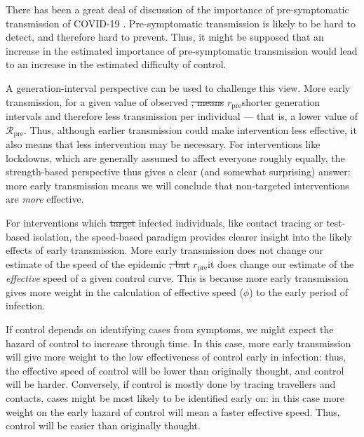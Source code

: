 \documentclass[12pt]{article}
\newcommand{\RR}{\ensuremath{{\mathcal R}}}
\newcommand{\Rx}[1]{\ensuremath{\RR_{\mathrm{#1}}}} %
\newcommand{\Rpre}{\Rx{pre}} %
\newcommand{\rr}{\ensuremath{{r}}}
\newcommand{\rx}[1]{\ensuremath{\rr_{\mathrm{#1}}}} %
\newcommand{\rpre}{\rx{pre}} %
\providecommand{\DIFaddtex}[1]{{\protect\color{blue}\uwave{#1}}} %
\providecommand{\DIFdeltex}[1]{{\protect\color{red}\sout{#1}}}                      %
\providecommand{\DIFaddbegin}{} %
\providecommand{\DIFaddend}{} %
\providecommand{\DIFdelbegin}{} %
\providecommand{\DIFdelend}{} %
\providecommand{\DIFadd}[1]{\texorpdfstring{\DIFaddtex{#1}}{#1}} %
\providecommand{\DIFdel}[1]{\texorpdfstring{\DIFdeltex{#1}}{}} %
\newcommand{\DIFscaledelfig}{0.5}
\newlength{\DIFdelgraphicswidth} %
\newlength{\DIFdelgraphicsheight} %
\newcommand{\DIFaddincludegraphics}[2][]{{\color{blue}\fbox{\DIFOincludegraphics[#1]{#2}}}} %
\newcommand{\DIFdelincludegraphics}[2][]{%
\sbox{\DIFdelgraphicsbox}{\DIFOincludegraphics[#1]{#2}}%
\settoboxwidth{\DIFdelgraphicswidth}{\DIFdelgraphicsbox} %
\settoboxtotalheight{\DIFdelgraphicsheight}{\DIFdelgraphicsbox} %
\scalebox{\DIFscaledelfig}{%
\parbox[b]{\DIFdelgraphicswidth}{\usebox{\DIFdelgraphicsbox}\\[-\baselineskip] \rule{\DIFdelgraphicswidth}{0em}}\llap{\resizebox{\DIFdelgraphicswidth}{\DIFdelgraphicsheight}{%
\setlength{\unitlength}{\DIFdelgraphicswidth}%
\begin{picture}(1,1)%
\thicklines\linethickness{2pt} %
{\color[rgb]{1,0,0}\put(0,0){\framebox(1,1){}}}%
{\color[rgb]{1,0,0}\put(0,0){\line( 1,1){1}}}%
{\color[rgb]{1,0,0}\put(0,1){\line(1,-1){1}}}%
\end{picture}%
}\hspace*{3pt}}} %
} %
\DeclareRobustCommand{\DIFaddbegin}{\DIFOaddbegin \let\includegraphics\DIFaddincludegraphics} %
\DeclareRobustCommand{\DIFaddend}{\DIFOaddend \let\includegraphics\DIFOincludegraphics} %
\DeclareRobustCommand{\DIFdelbegin}{\DIFOdelbegin \let\includegraphics\DIFdelincludegraphics} %
\DeclareRobustCommand{\DIFdelend}{\DIFOaddend \let\includegraphics\DIFOincludegraphics} %
\begin{document}
There has been a great deal of discussion of the importance of pre-symptomatic transmission of COVID-19 \cite{ferretti2020quantifying, he2020temporal, hellewell2020feasibility}. 
Pre-symptomatic transmission is likely to be hard to detect, and therefore hard to prevent. 
Thus, it might be supposed that an increase in the estimated importance of pre-symptomatic transmission would lead to an increase in the estimated difficulty of control.

A generation-interval perspective \cite{park2019practical} can be used to challenge this view. 
More early transmission, for a given value of observed \DIFdelbegin %
\DIFdel{, means }%
\DIFdelend \DIFaddbegin \rpre\DIFadd{, means }\DIFaddend shorter generation intervals and therefore \DIFdelbegin %
\DIFdelend less transmission per individual --- that is, a lower value of \DIFdelbegin %
\DIFdelend \DIFaddbegin \Rpre\DIFaddend . Thus, although earlier transmission could make intervention less effective, it also means that less intervention may be necessary. For interventions like lockdowns, which are generally assumed to affect everyone roughly equally, the strength-based perspective thus gives a clear (and somewhat surprising) answer: more early transmission means we will conclude that non-targeted interventions are \emph{more} effective.

For interventions which \DIFdelbegin %
\DIFdel{target }%
\DIFdelend \DIFaddbegin \DIFadd{target }\DIFaddend infected individuals, like contact tracing or test-based isolation, the speed-based paradigm provides clearer insight into the likely effects of early transmission. 
More early transmission does not change our estimate of the \DIFaddbegin \DIFadd{initial }\DIFaddend speed of the epidemic \DIFdelbegin \DIFdel{, but }\DIFdelend \DIFaddbegin \rpre\DIFadd{, which is inferred from data. But }\DIFaddend it does change our estimate of the \emph{effective} speed of a given control curve. 
This is because more early transmission gives more weight in the calculation of effective speed ($\phi$) to the early period of infection.

If control depends on identifying cases from symptoms, we might expect the hazard of control to increase through time. In this case, more early transmission will give more weight to the low effectiveness of control early in infection: thus, the effective speed of control will be lower than originally thought, and control will be harder.
Conversely, if control is mostly done by tracing travellers and contacts, cases might be most likely to be identified early on: in this case more weight on the early hazard of control will mean a faster effective speed. Thus, control will be easier than originally thought. 
\end{document}
